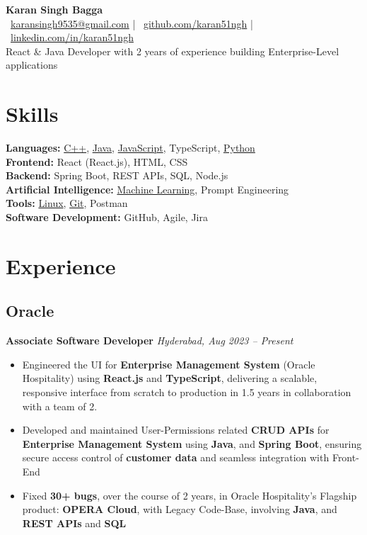 \documentclass[a4paper,8pt]{article}
\newcommand{\linuxGitHub}{\href{https://github.com/karan51ngh/karan51ngh}{Linux}}
\newcommand{\gitGitHub}{\href{https://github.com/karan51ngh/gitCheatSheet}{Git}}
\newcommand{\jsGitHub}{\href{https://github.com/karan51ngh?tab=repositories&q=&type=&language=javascript}{JavaScript}}
\newcommand{\cppGitHub}{\href{https://github.com/karan51ngh/topicWiseQuestions}{C++}}
\newcommand{\pythonGitHub}{\href{https://github.com/karan51ngh?tab=repositories&q=&type=&language=python}{Python}}
\newcommand{\MachineLearning}{\href{https://github.com/karan51ngh/machineLearning}{Machine Learning}}
\newcommand{\Java}{\href{https://github.com/karan51ngh/javaprogramming}{Java}}
\begin{document}
\begin{center}
  {\LARGE \textbf{Karan Singh Bagga}} \\
  \faEnvelope\ \href{mailto:karansingh9535@gmail.com}{karansingh9535@gmail.com} \quad | \quad
  \faGithub\ \href{https://github.com/karan51ngh}{github.com/karan51ngh} \quad | \quad
  \faLinkedin\ \href{https://linkedin.com/in/karan51ngh}{linkedin.com/in/karan51ngh} \\
  \vspace{0.2em}
  React \& Java Developer with 2 years of experience building Enterprise-Level applications
\end{center}


\section*{\faTools\hspace{0.5em}Skills}
\textbf{Languages:} \cppGitHub, \Java, \jsGitHub, {TypeScript}, \pythonGitHub \\
\textbf{Frontend:} React (React.js), HTML, CSS \\
\textbf{Backend:} Spring Boot, REST APIs, SQL, Node.js\\
\textbf {Artificial Intelligence:} \MachineLearning, Prompt Engineering \\
\textbf{Tools:} \linuxGitHub, \gitGitHub, Postman \\
\textbf{Software Development:} GitHub, Agile, Jira

\section*{\faBriefcase\hspace{0.5em}Experience}
\subsection*{Oracle }

\textbf{Associate Software Developer} \hfill \textit{Hyderabad, Aug 2023 -- Present}
\begin{itemize}[leftmargin=1.5em]
  \item Engineered the UI for \textbf{Enterprise Management System} (Oracle Hospitality) using \textbf{React.js} and \textbf{TypeScript}, delivering a scalable, responsive interface from scratch to production in 1.5 years in collaboration with a team of 2.
  \item Developed and maintained User-Permissions related \textbf{CRUD APIs} for \textbf{Enterprise Management System} using \textbf{Java}, and \textbf{Spring Boot}, ensuring secure access control of \textbf{customer data} and seamless integration with Front-End
  \item Fixed \textbf{30+ bugs}, over the course of 2 years, in Oracle Hospitality's Flagship product: \textbf{OPERA Cloud}, with Legacy Code-Base, involving \textbf{Java}, and \textbf{REST APIs} and \textbf{SQL}
\end{itemize}
\end{document}
